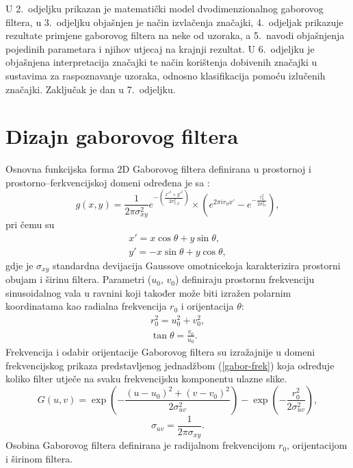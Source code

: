 \documentclass{article}
\begin{document}
U 2.~odjeljku prikazan je matematički model dvodimenzionalnog gaborovog filtera,
u 3.~odjeljku objašnjen je način izvlačenja značajki, 4.~odjeljak prikazuje
rezultate primjene gaborovog filtera na neke od uzoraka, a 5.~navodi objašnjenja
pojedinih parametara i njihov utjecaj na krajnji rezultat. U 6.~odjeljku je
objašnjena interpretacija značajki te način korištenja dobivenih značajki u
sustavima za raspoznavanje uzoraka, odnosno klasifikacija pomoću izlučenih
značajki. Zaključak je dan u 7.~odjeljku.

\section{Dizajn gaborovog filtera}
Osnovna funkcijska forma 2D Gaborovog filtera definirana u prostornoj i
prostorno--ferkvencijskoj domeni određena je sa \citep{huang2005robust}:
\begin{equation}
g(x,y)=\frac{1}{2\pi \sigma^2_{xy}}e^{-\left ( \frac{x'^2 +
y'^2}{2\sigma^2_{x,y}} \right)} \times \left ( e^{2\pi i r_0 x'} -
e^{-\frac{r_0^2}{2\sigma^2_{uv}}}\right),
\label{2d-gabor}
\end{equation}
pri čemu su
\begin{eqnarray*}
x' = x \cos \theta + y \sin \theta, \\
y' = -x \sin \theta + y \cos \theta,
\end{eqnarray*}
gdje je $\sigma_{xy}$ standardna devijacija Gaussove omotnicekoja karakterizira prostorni obujam i širinu filtera. Parametri
($u_0$, $v_0$) definiraju prostornu frekvenciju sinusoidalnog vala u ravnini koji
također može biti izražen polarnim koordinatama kao radialna frekvencija $r_0$ i
orijentacija $\theta$:
\begin{eqnarray}
r_0^2 = u_0^2 + v_0^2, \\
\tan \theta = \frac{v_0}{u_0}.
\end{eqnarray}
Frekvencija i odabir orijentacije Gaborovog filtera su izražajnije u domeni
frekvencijskog prikaza predstavljenog jednadžbom (\ref{gabor-frek}) koja
određuje koliko filter utječe na svaku frekvencijsku komponentu ulazne slike.
\begin{equation}
G(u,v) = \exp \left ( - \frac{(u-u_0)^2 + (v-v_0)^2}{2\sigma^2_{uv}}\right ) -
\exp \left ( - \frac{r_0^2}{2\sigma^2_{uv}} \right),
\label{gabor-frek}
\end{equation}
\begin{equation}
\sigma_{uv} = \frac{1}{2\pi \sigma_{xy}}.
\end{equation}
Osobina Gaborovog filtera definirana je radijalnom frekvencijom $r_0$,
orijentacijom i širinom filtera.
\end{document}
